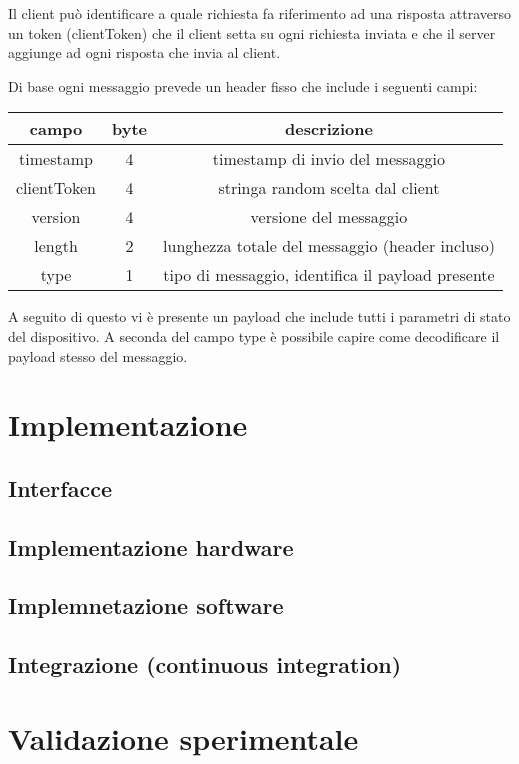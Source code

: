 \documentclass{article}
\begin{document}
Il client può identificare a quale richiesta fa riferimento ad una risposta attraverso un 
token (clientToken) che il client setta su ogni richiesta inviata e che il server aggiunge 
ad ogni risposta che invia al client. 

Di base ogni messaggio prevede un header fisso che include i seguenti campi:

\begin{center}
\begin{tabular}{| c | c | c |}
    \hline
    campo & byte & descrizione \\
    \hline 
    timestamp & 4 & timestamp di invio del messaggio \\
    \hline 
    clientToken & 4 & stringa random scelta dal client \\
    \hline 
    version & 4 & versione del messaggio \\ 
    \hline
    length & 2 & lunghezza totale del messaggio (header incluso) \\ 
    \hline 
    type & 1 & tipo di messaggio, identifica il payload presente \\
    \hline
\end{tabular}
\end{center}

A seguito di questo vi è presente un payload che include tutti i parametri di stato del dispositivo.
A seconda del campo type è possibile capire come decodificare il payload stesso del messaggio. 

\section{Implementazione}
\subsection{Interfacce}
\subsection{Implementazione hardware}
\subsection{Implemnetazione software}
\subsection{Integrazione (continuous integration)}

\section{Validazione sperimentale}
\end{document}
